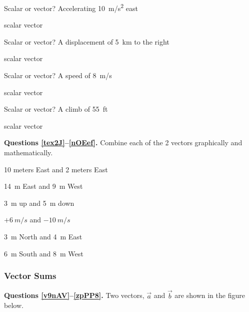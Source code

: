 \documentclass[]{exam}
\begin{document}
\begin{questions}
\question
Scalar or vector? Accelerating \SI{10}{m/s^2} east

\begin{randomizechoices}[norandomize]
    \choice scalar
    \correctchoice vector
\end{randomizechoices}


\question
Scalar or vector? A displacement of \SI{5}{km} to the right

\begin{randomizechoices}[norandomize]
    \choice scalar
    \correctchoice vector
\end{randomizechoices}

\question 
Scalar or vector? A speed of \SI{8}{m/s}

\begin{randomizechoices}[norandomize]
    \correctchoice scalar
    \choice vector
\end{randomizechoices}

\question \label{scalar-last}
Scalar or vector?
A climb of \SI{55}{ft}

\begin{randomizechoices}[norandomize]
    \correctchoice scalar
    \choice vector
\end{randomizechoices}

\begin{EnvUplevel}
    \textbf{Questions \ref{tex2J}--\ref{nOEef}.} Combine each of the 2 vectors graphically and mathematically.
\end{EnvUplevel} 

\question \label{tex2J}
10 meters East and 2 meters East

\question
\SI{14}{m} East and \SI{9}{m} West

\question
\SI{3}{m} up and \SI{5}{m} down

\question 
$+\SI{6}{m/s}$ and $-\SI{10}{m/s}$

\question
\SI{3}{m} North and \SI{4}{m} East

\question \label{nOEef}
\SI{6}{m} South and \SI{8}{m} West

\end{questions}

\subsubsection{Vector Sums}

\textbf{Questions \ref{v9nAV}--\ref{zpPP8}.} Two vectors, $\vec{a}$ and $\vec{b}$ are shown in the figure below.
\end{document}
